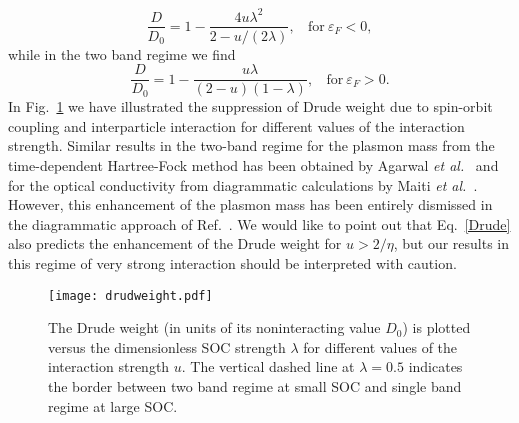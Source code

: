 \documentclass[aps, pra, reprint,superscriptaddress]{revtex4-1}
\begin{document}
\begin{equation}\label{drude_1band}
 \frac{D}{D_{0}}= 1- \frac{4u\lambda^2}{2-{u/(2\lambda)}}, ~~~~\textrm{for}~\varepsilon_F<0,
\end{equation} 
 while in the two band regime we find
\begin{equation}\label{drude_2band}
 \frac{D}{D_{0}}= 1- \frac{u\lambda}{(2-{u})( 1-\lambda)}, ~~~~\textrm{for}~\varepsilon_F>0.
\end{equation} 
In Fig.~\ref{fig:drude} we have illustrated the suppression of Drude weight due to spin-orbit coupling and interparticle interaction for different values of the interaction strength. 
Similar results in the two-band regime for the plasmon mass from the time-dependent Hartree-Fock method has been obtained by Agarwal \textit{et al.}~\cite{Amit2011} and for the optical conductivity from diagrammatic calculations by Maiti \textit{et al.}~\cite{Maiti2015}. However, this enhancement of the plasmon mass has been entirely dismissed in the diagrammatic approach of  Ref.~\cite{Maiti2015}.
We would like to point out that Eq.~\eqref{Drude} also predicts the enhancement of the Drude weight for $u>2/\eta$, but our results in this regime of very strong interaction should be interpreted with caution.
\begin{figure}
      \texttt{[image: drudweight.pdf]}
    \caption{The Drude weight (in units of its noninteracting value $D_0$) is plotted versus the dimensionless SOC strength $\lambda$ for different values of the interaction strength $u$. The vertical dashed line at $\lambda=0.5$ indicates the border between two band regime at small SOC and single band regime at large SOC. \label{fig:drude}}
\end{figure}

\end{document}
